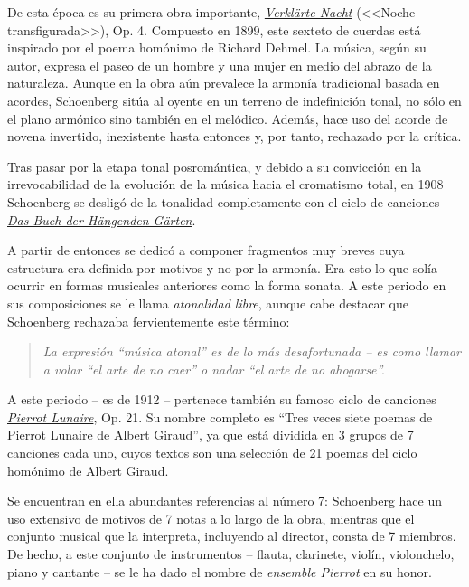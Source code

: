 De esta época es su primera obra importante, \href{https://www.youtube.com/watch?v=vqODySSxYpc}{\emph{Verklärte Nacht}} (<<{Noche transfigurada}>>), Op. 4. Compuesto en 1899, este sexteto de cuerdas está inspirado por el poema homónimo de Richard Dehmel. La música, según su autor, expresa el paseo de un hombre y una mujer en medio del abrazo de la naturaleza.  Aunque en la obra aún prevalece la armonía tradicional basada en acordes, Schoenberg sitúa al oyente en un terreno de indefinición tonal, no sólo en el plano armónico sino también en el melódico. Además, hace uso del acorde de novena invertido, inexistente hasta entonces y, por tanto, rechazado por la crítica.
%
\cite{diaz}

Tras pasar por la etapa tonal posromántica, y debido a su convicción en la irrevocabilidad de la evolución de la música hacia el cromatismo total, en 1908 Schoenberg se desligó de la tonalidad completamente con el ciclo de canciones \href{https://www.youtube.com/watch?v=3iXsKhaZB2Q}{\emph{Das Buch der Hängenden Gärten}}. 

A partir de entonces se dedicó a componer fragmentos muy breves cuya estructura era definida por motivos y no por la armonía. Era esto lo que solía ocurrir en formas musicales anteriores como la forma sonata. A este periodo en sus composiciones se le llama \emph{atonalidad libre}, aunque cabe destacar que Schoenberg rechazaba fervientemente este término:

\begin{quote}
\emph{La expresión ``música atonal'' es de lo más desafortunada -- es como llamar a volar ``el arte de no caer'' o nadar ``el arte de no ahogarse''.}\\
\end{quote}

A este periodo -- es de 1912 -- pertenece también su famoso ciclo de canciones \href{https://www.youtube.com/watch?v=vQVkbKULKpI}{\emph{Pierrot Lunaire}}, Op. 21. Su nombre completo es ``Tres veces siete poemas de Pierrot Lunaire de Albert Giraud'', ya que está dividida en 3 grupos de 7 canciones cada uno, cuyos textos son una selección de 21 poemas del ciclo homónimo de Albert Giraud. 

Se encuentran en ella abundantes referencias al número 7: Schoenberg hace un uso extensivo de motivos de 7 notas a lo largo de la obra, mientras que el conjunto musical que la interpreta, incluyendo al director, consta de 7 miembros. De hecho, a este conjunto de instrumentos -- flauta, clarinete, violín, violonchelo, piano y cantante -- se le ha dado el nombre de \textit{ensemble Pierrot} en su honor. 

